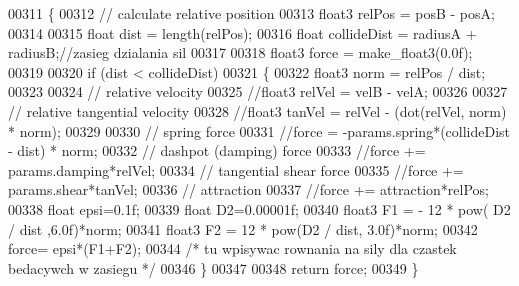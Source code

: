 \begin{DoxyCode}
00311 \{
00312     \textcolor{comment}{// calculate relative position}
00313     float3 relPos = posB - posA;
00314 
00315     \textcolor{keywordtype}{float} dist = length(relPos);
00316     \textcolor{keywordtype}{float} collideDist = radiusA + radiusB;\textcolor{comment}{//zasieg dzialania sil}
00317 
00318     float3 force = make\_float3(0.0f);
00319 
00320     \textcolor{keywordflow}{if} (dist < collideDist)
00321     \{
00322         float3 norm = relPos / dist;
00323 
00324         \textcolor{comment}{// relative velocity}
00325         \textcolor{comment}{//float3 relVel = velB - velA;}
00326 
00327         \textcolor{comment}{// relative tangential velocity}
00328         \textcolor{comment}{//float3 tanVel = relVel - (dot(relVel, norm) * norm);}
00329 
00330         \textcolor{comment}{// spring force}
00331         \textcolor{comment}{//force = -params.spring*(collideDist - dist) * norm;}
00332         \textcolor{comment}{// dashpot (damping) force}
00333         \textcolor{comment}{//force += params.damping*relVel;}
00334         \textcolor{comment}{// tangential shear force}
00335         \textcolor{comment}{//force += params.shear*tanVel;}
00336         \textcolor{comment}{// attraction}
00337         \textcolor{comment}{//force += attraction*relPos;}
00338                 \textcolor{keywordtype}{float} epsi=0.1f;
00339                 \textcolor{keywordtype}{float} D2=0.00001f;
00340                 float3 F1 = - 12 * pow( D2 /  dist ,6.0f)*norm;
00341                 float3 F2 = 12 * pow(D2 / dist, 3.0f)*norm;
00342                 force= epsi*(F1+F2);
00344 \textcolor{comment}{/*      tu wpisywac rownania na sily dla czastek bedacywch w zasiegu    */}
00346     \}
00347 
00348     \textcolor{keywordflow}{return} force;
00349 \}
\end{DoxyCode}
